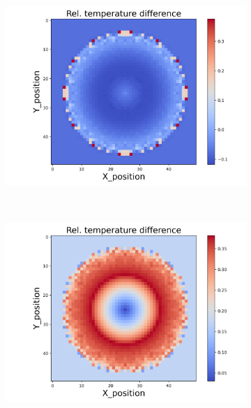 \begin{figure}[h]
\begin{minipage}{\textwidth}
\begin{subfigure}{0.325\textwidth}
            \centering
            \includegraphics[width=\textwidth]{figures/raw_data/31/mix/T_bias.jpg}
        \end{subfigure}
    \end{minipage}\\
    \begin{minipage}{\textwidth}
        \centering
        \begin{subfigure}{0.325\textwidth}
            \centering
            \includegraphics[width=\textwidth]{figures/raw_data/32/mix/T_bias.jpg}
        \end{subfigure}
        \begin{subfigure}{0.325\textwidth}

\end{subfigure}
\end{minipage}
\end{figure}

